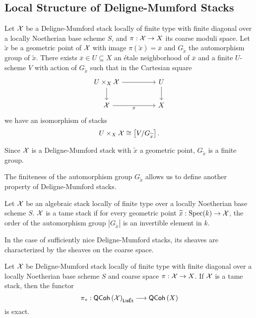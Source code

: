 \subsection{Local Structure of Deligne-Mumford Stacks}\label{subsec: local structure of DM stacks}
\begin{theorem}\label{def: local structure of DM stacks}
    Let $\mathcal{X}$ be a Deligne-Mumford stack locally of finite type with finite diagonal over a locally Noetherian base scheme $S$, and $\pi:\mathcal{X}\to X$ its coarse moduli space. Let $\widetilde{x}$ be a geometric point of $\mathcal{X}$ with image $\pi(\widetilde{x})=\overline{x}$ and $G_{\widetilde{x}}$ the automorphism group of $\widetilde{x}$. There exists $\overline{x}\in U\subseteq X$ an \'{e}tale neighborhood of $\overline{x}$ and a finite $U$-scheme $V$ with action of $G_{\widetilde{x}}$ such that in the Cartesian square 
    $$%
    \begin{tikzcd}
        {U\times_{X}\Xcal} && U \\
        \Xcal && X
        \arrow["\pi"', from=2-1, to=2-3]
        \arrow[from=1-3, to=2-3]
        \arrow[from=1-1, to=2-1]
        \arrow[from=1-1, to=1-3]
    \end{tikzcd}$$
    we have an isomorphism of stacks 
    $$U\times_{X}\mathcal{X}\cong\left[V/G_{\widetilde{x}}\right].$$
\end{theorem}
\begin{remark}
    Since $\mathcal{X}$ is a Deligne-Mumford stack with $\widetilde{x}$ a geometric point, $G_{\widetilde{x}}$ is a finite group. 
\end{remark}
The finiteness of the automorphism group $G_{\widetilde{x}}$ allows us to define another property of Deligne-Mumford stacks. 
\begin{definition}\label{def: tame DM stack}
    Let $\mathcal{X}$ be an algebraic stack locally of finite type over a locally Noetherian base scheme $S$. $\mathcal{X}$ is a tame stack if for every geometric point $\widetilde{x}:\operatorname{Spec}(k)\to\mathcal{X}$, the order of the automorphism group $|G_{\widetilde{x}}|$ is an invertible element in $k$. 
\end{definition}
In the case of sufficiently nice Deligne-Mumford stacks, its sheaves are characterized by the sheaves on the coarse space. 
\begin{proposition}\label{prop: exact map of QCoh sheaves on stacks to coarse space}
    Let $\mathcal{X}$ be Deligne-Mumford stack locally of finite type with finite diagonal over a locally Noetherian base scheme $S$ and coarse space $\pi:\mathcal{X}\to X$. If $\mathcal{X}$ is a tame stack, then the functor 
    $$\pi_{*}:\mathsf{QCoh}\left(\mathcal{X}\right)_{\mathsf{Lis\acute{E}t}}\longrightarrow\mathsf{QCoh}\left(X\right)$$
    is exact. 
\end{proposition}
